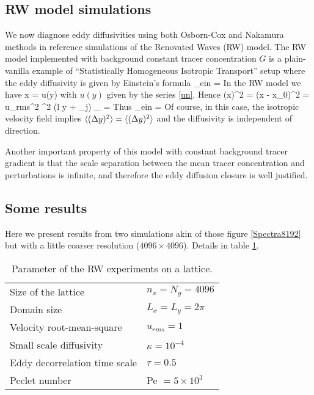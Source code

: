 \documentclass[11pt]{article}
\begin{document}
\subsection{RW model simulations}
We now diagnose eddy diffusivities using both Osborn-Cox and Nakamura methods in reference simulations of the Renovated Waves (RW) model.  The RW model implemented with background constant tracer concentration $G$ is a plain-vanilla example of ``Statistically Homogeneous Isotropic Transport'' setup where the eddy diffusivity is given by Einstein's formula
\beq
\label{einstein_eddy_diffusivity}
\kappa_{ein} = \per
\eeq 
In the RW model we have
\beq
\label{dxdt}
\dot x = u(y)\com
\eeq
with $u(y)$ given by the series \eqref{un}. Hence
\beq
\label{dx2}
\la (\Delta x)^2 \ra = \la (x - x_0)^2 \ra = u_{rms}^2 \tau^2 \la \cos (l y + \psi_j) \ra_{\psi} = \per 
\eeq
Thus
\beq
\label{einstein_eddy_diffusivity}
\kappa_{ein} = \per
\eeq 
Of course, in this case, the isotropic velocity field implies $\langle (\Delta y)^2\rangle = \langle (\Delta y)^2\rangle$ and the diffusivity is independent of direction.

Another important property of this model with constant background tracer gradient is that the scale separation between the mean tracer concentration and perturbations is infinite, and therefore the eddy diffusion closure is well justified.

\subsection{Some results}

Here we present results from two simulations akin of those figure \ref{Spectra8192} but with a little coarser resolution ($4096\times 4096$). Details in table \ref{RWExp}.
\begin{table}
\begin{center}
   \caption{\small Parameter of the RW experiments on a lattice.}
    \begin{tabular}{  l | l}
    \hline
    \hline
    	Size of the lattice & $n_x = N_y = 4096$\\
	Domain size & $L_x = L_y = 2 \pi$\\
	Velocity root-mean-square & $u_{rms} = 1$ \\
	Small scale diffusivity & $\kappa = 10^{-4} $\\
	Eddy decorrelation time scale & $\tau = 0.5$ \\
	Peclet number & \textsf{Pe} $= 5 \times10^3 $\\
    \hline
    \end{tabular}
    \end{center}
    \label{RWExp}
        \end{table}
\end{document}
